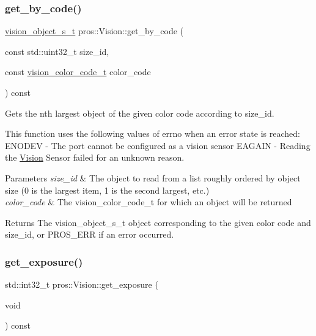 \subsubsection{\texorpdfstring{get\+\_\+by\+\_\+code()}{get\_by\_code()}}
{\footnotesize\ttfamily \hyperlink{vision_8h_ae619120558539c13e53b5a6f42fb4375}{vision\+\_\+object\+\_\+s\+\_\+t} pros\+::\+Vision\+::get\+\_\+by\+\_\+code (\begin{DoxyParamCaption}\item[{const std\+::uint32\+\_\+t}]{size\+\_\+id,  }\item[{const \hyperlink{vision_8h_a71f2011a47e95558bb534b05c16c7f2b}{vision\+\_\+color\+\_\+code\+\_\+t}}]{color\+\_\+code }\end{DoxyParamCaption}) const}



Gets the nth largest object of the given color code according to size\+\_\+id. 

This function uses the following values of errno when an error state is reached\+: E\+N\+O\+D\+EV -\/ The port cannot be configured as a vision sensor E\+A\+G\+A\+IN -\/ Reading the \hyperlink{classpros_1_1Vision}{Vision} Sensor failed for an unknown reason.


\begin{DoxyParams}{Parameters}
{\em size\+\_\+id} & The object to read from a list roughly ordered by object size (0 is the largest item, 1 is the second largest, etc.) \\
\hline
{\em color\+\_\+code} & The vision\+\_\+color\+\_\+code\+\_\+t for which an object will be returned\\
\hline
\end{DoxyParams}
\begin{DoxyReturn}{Returns}
The vision\+\_\+object\+\_\+s\+\_\+t object corresponding to the given color code and size\+\_\+id, or P\+R\+O\+S\+\_\+\+E\+RR if an error occurred. 
\end{DoxyReturn}
\mbox{\label{classpros_1_1Vision_a80552b2897b8edcdb68bc56477213f2e}} 
\subsubsection{\texorpdfstring{get\+\_\+exposure()}{get\_exposure()}}
{\footnotesize\ttfamily std\+::int32\+\_\+t pros\+::\+Vision\+::get\+\_\+exposure (\begin{DoxyParamCaption}\item[{void}]{ }\end{DoxyParamCaption}) const}



